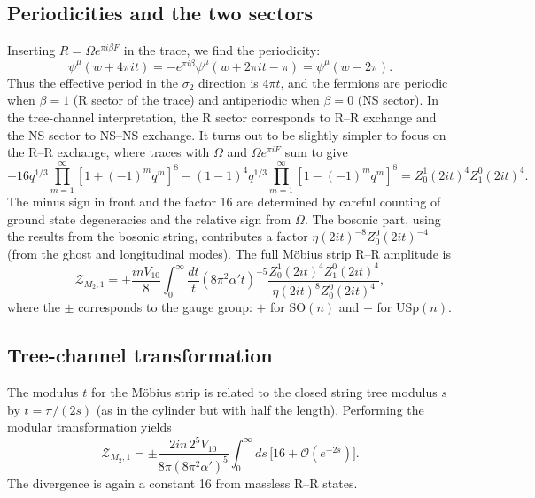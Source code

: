\documentclass[11pt,a4paper]{article}
\begin{document}
\subsection{Periodicities and the two sectors}
Inserting $R = \Omega e^{\pi i \beta F}$ in the trace, we find the periodicity:
\begin{equation}
\psi^\mu(w+4\pi i t) = -e^{\pi i \beta} \psi^\mu(w+2\pi i t - \pi) = \psi^\mu(w - 2\pi).
\end{equation}
Thus the effective period in the $\sigma_2$ direction is $4\pi t$, and the fermions are periodic when $\beta=1$ (R sector of the trace) and antiperiodic when $\beta=0$ (NS sector). In the tree-channel interpretation, the R sector corresponds to R–R exchange and the NS sector to NS–NS exchange. It turns out to be slightly simpler to focus on the R–R exchange, where traces with $\Omega$ and $\Omega e^{\pi i F}$ sum to give
\begin{equation}
-16 q^{1/3} \prod_{m=1}^\infty [1 + (-1)^m q^m]^8 - (1-1)^4 q^{1/3} \prod_{m=1}^\infty [1 - (-1)^m q^m]^8 = Z^1_0(2it)^4 Z^0_1(2it)^4.
\label{eq:MobiusRRtrace}
\end{equation}
The minus sign in front and the factor 16 are determined by careful counting of ground state degeneracies and the relative sign from $\Omega$. The bosonic part, using the results from the bosonic string, contributes a factor $\eta(2it)^{-8} Z^0_0(2it)^{-4}$ (from the ghost and longitudinal modes). The full M\"obius strip R–R amplitude is
\begin{equation}
\mathcal{Z}_{M_2,1} = \pm \frac{i n V_{10}}{8} \int_0^\infty \frac{dt}{t} (8\pi^2\alpha' t)^{-5} \frac{Z^1_0(2it)^4 Z^0_1(2it)^4}{\eta(2it)^8 Z^0_0(2it)^4},
\end{equation}
where the $\pm$ corresponds to the gauge group: $+$ for $\mathrm{SO}(n)$ and $-$ for $\mathrm{USp}(n)$.

\subsection{Tree-channel transformation}
The modulus $t$ for the M\"obius strip is related to the closed string tree modulus $s$ by $t = \pi/(2s)$ (as in the cylinder but with half the length). Performing the modular transformation yields
\begin{equation}
\mathcal{Z}_{M_2,1} = \pm \frac{2 i n \, 2^5 V_{10}}{8\pi (8\pi^2\alpha')^5} \int_0^\infty ds \, \big[ 16 + \mathcal{O}(e^{-2s}) \big].
\label{eq:ZM21}
\end{equation}
The divergence is again a constant 16 from massless R–R states.
\end{document}
